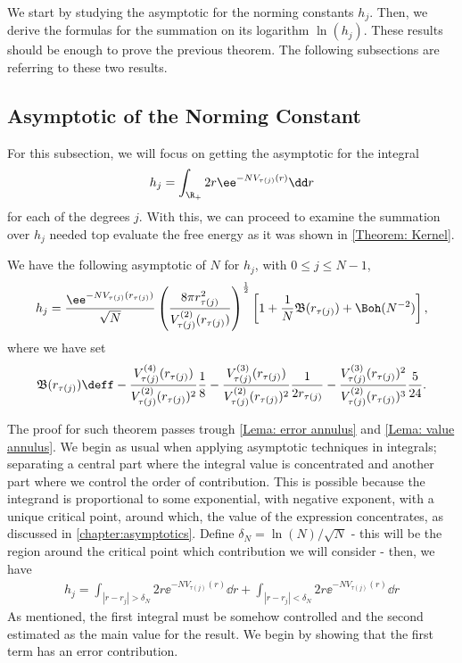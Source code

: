 We start by studying the asymptotic for the norming constants $h_j$. Then, we derive the formulas for the summation on its logarithm $\ln(h_j)$. These results should be enough to prove the previous theorem. The following subsections are referring to these two results.

\subsection{Asymptotic of the Norming Constant}

For this subsection, we will focus on getting the asymptotic for the integral
\begin{equation}
	h_j = \int_{\R_+} 2r \ee^{-N V_{\tau(j)}(r)} \dd r
\end{equation}
for each of the degrees $j$. With this, we can proceed to examine the summation over $h_j$ needed top evaluate the free energy as it was shown in \autoref{Theorem: Kernel}.


\begin{teorema}	\label{Theorem: hj annulus}
	We have the following asymptotic of $N$ for $h_j$, with $0 \leq j \leq N-1$,
	\begin{equation}
		h_j = \frac{\ee^{-N V_{\tau(j)}(r_{\tau(j)})}}{\sqrt{N}} \left( \frac{8\pi r_{\tau(j)}^2}{V^{(2)}_{\tau(j)}(r_{\tau(j)})} \right)^{\frac{1}{2}} \left[ 1 + \frac{1}{N} \mathfrak{B}(r_{\tau(j)}) + \Boh(N^{-2}) \right],
		\label{Equation: Asymptotic hj annulus}
	\end{equation}
	where we have set 
	\begin{equation}
		\mathfrak{B}(r_{\tau(j)}) \deff -\frac{V^{(4)}_{\tau(j)}(r_{\tau(j)})}{V^{(2)}_{\tau(j)}(r_{\tau(j)})^2} \frac{1}{8} - \frac{V^{(3)}_{\tau(j)}(r_{\tau(j)})}{V^{(2)}_{\tau(j)}(r_{\tau(j)})^{2}} \frac{1}{2 r_{\tau(j)}} - \frac{V^{(3)}_{\tau(j)}(r_{\tau(j)})^2}{V^{(2)}_{\tau(j)}(r_{\tau(j)})^{3}} \frac{5}{24}.
	\end{equation}
\end{teorema}

The proof for such theorem passes trough \autoref{Lema: error annulus} and \autoref{Lema: value annulus}. We begin as usual when applying asymptotic techniques in integrals; separating a central part where the integral value is concentrated and another part where we control the order of contribution. This is possible because the integrand is proportional to some exponential, with negative exponent, with a unique critical point, around which, the value of the expression concentrates, as discussed in \autoref{chapter:asymptotics}. Define $\delta_N = \ln(N)/\sqrt{N}$ - this will be the region around the critical point which contribution we will consider - then, we have
\begin{align}
	h_j =  \int_{|r - r_j| > \delta_N} 2r \ee^{-N V_{\tau(j)}(r)} \dd r + \int_{|r - r_j| < \delta_N} 2r \ee^{-N V_{\tau(j)}(r)} \dd r
	\label{Equation: Separation annulus}
\end{align}
As mentioned, the first integral must be somehow controlled and the second estimated as the main value for the result.  We begin by showing that the first term has an error contribution.

